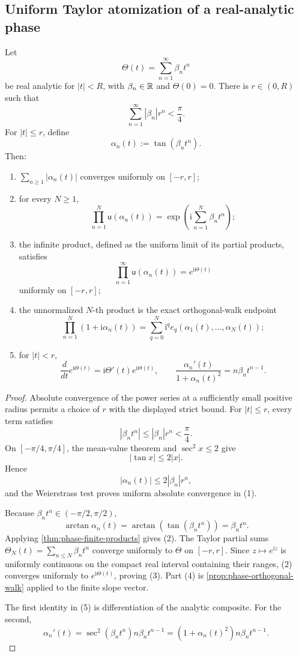 \subsection{Uniform Taylor atomization of a real-analytic phase}

\begin{theorem}
\label{thm:phase-taylor-atomization}
Let
\[
 \Theta(t)=\sum_{n=1}^{\infty}\beta_nt^n
\]
be real analytic for \(|t|<R\), with \(\beta_n\in\mathbb R\) and \(\Theta(0)=0\).
There is \(r\in(0,R)\) such that
\[
 \sum_{n=1}^{\infty}|\beta_n|r^n<\frac{\pi}{4}.
\]
For \(|t|\leq r\), define
\[
 \alpha_n(t):=\tan(\beta_nt^n).
\]
Then:
\begin{enumerate}
\item \(\sum_{n\geq1}|\alpha_n(t)|\) converges uniformly on \([-r,r]\);
\item for every \(N\geq1\),
\[
 \prod_{n=1}^N\mathsf u(\alpha_n(t))
 =
 \exp\left(\mathrm i\sum_{n=1}^N\beta_nt^n\right);
\]
\item the infinite product, defined as the uniform limit of its partial products,
satisfies
\[
 \prod_{n=1}^{\infty}\mathsf u(\alpha_n(t))
 =
 e^{\mathrm i\Theta(t)}
\]
uniformly on \([-r,r]\);
\item the unnormalized \(N\)-th product is the exact orthogonal-walk endpoint
\[
 \prod_{n=1}^N(1+\mathrm i\alpha_n(t))
 =
 \sum_{q=0}^N\mathrm i^q
 e_q(\alpha_1(t),\ldots,\alpha_N(t));
\]
\item for \(|t|<r\),
\[
 \frac{d}{dt}e^{\mathrm i\Theta(t)}
 =
 \mathrm i\Theta'(t)e^{\mathrm i\Theta(t)},
\qquad
 \frac{\alpha_n'(t)}{1+\alpha_n(t)^2}
 =
 n\beta_nt^{n-1}.
\]
\end{enumerate}
\end{theorem}

\begin{proof}
Absolute convergence of the power series at a sufficiently small positive
radius permits a choice of \(r\) with the displayed strict bound.  For
\(|t|\leq r\), every term satisfies
\[
 |\beta_nt^n|
 \leq|\beta_n|r^n
 <\frac{\pi}{4}.
\]
On \([-\pi/4,\pi/4]\), the mean-value theorem and
\(\sec^2x\leq2\) give
\[
 |\tan x|\leq2|x|.
\]
Hence
\[
 |\alpha_n(t)|
 \leq2|\beta_n|r^n,
\]
and the Weierstrass test proves uniform absolute convergence in (1).

Because \(\beta_nt^n\in(-\pi/2,\pi/2)\),
\[
 \arctan\alpha_n(t)
 =
 \arctan(\tan(\beta_nt^n))
 =
 \beta_nt^n.
\]
Applying \cref{thm:phase-finite-products} gives (2).  The Taylor partial sums
\(\Theta_N(t)=\sum_{n\leq N}\beta_nt^n\) converge uniformly to \(\Theta\) on
\([-r,r]\).  Since \(z\mapsto e^{\mathrm iz}\) is uniformly continuous on
the compact real interval containing their ranges, (2) converges uniformly to
\(e^{\mathrm i\Theta(t)}\), proving (3).  Part (4) is
\cref{prop:phase-orthogonal-walk} applied to the finite slope vector.

The first identity in (5) is differentiation of the analytic composite.  For
the second,
\[
 \alpha_n'(t)
 =
 \sec^2(\beta_nt^n)n\beta_nt^{n-1}
 =
 (1+\alpha_n(t)^2)n\beta_nt^{n-1}.
\]
\end{proof}

